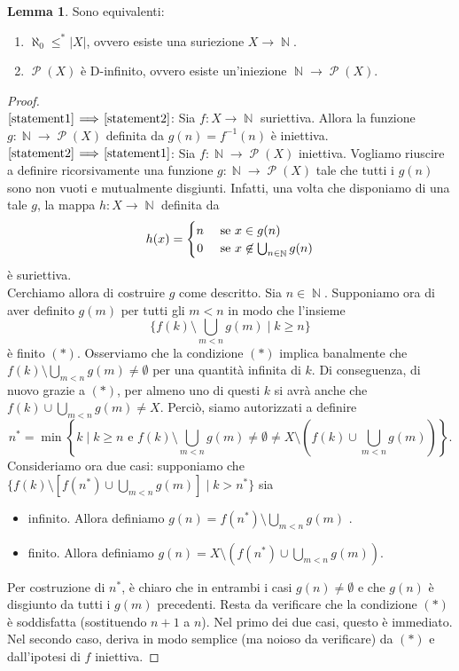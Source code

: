 \documentclass[12pt,a4paper]{report}
\theoremstyle{definition}
\newtheorem{lemma}[teo]{Lemma}  %
\theoremstyle{num.custom-title}
\DeclareMathOperator{\PP}{\mathcal{P}}
\DeclareMathOperator{\N}{\mathbb{N}}
\DeclareMathOperator{\sm}{\setminus}
\newcommand{\Implies}[2]{$\text{\ref{statement#1}}\!\implies\!\text{\ref{statement#2}}$}%
\newcommand{\punto}[1]{\item \label{statement#1}}
\newenvironment{equivalence}
    {\begin{enumerate}[label=(\arabic*),ref=(\arabic*)]
    }
    { 
	\end{enumerate}
    }
\begin{document}
\begin{lemma}\label{lemma_suriez_d-fin} Sono equivalenti:
\begin{equivalence}
\punto{1} $\aleph_0 \leq^* |X|$, ovvero esiste una suriezione $X \to \N$.
\punto{2} $\PP(X)$ è D-infinito, ovvero esiste un'iniezione $\N \to \PP(X)$.
\end{equivalence}
\begin{proof}\ \\
\Implies{1}{2}: Sia $f: X \to \N$ suriettiva. Allora la funzione $g: \N \to \PP(X)$ definita da $g(n)=f^{-1}(n)$ è iniettiva.\\
\Implies{2}{1}: Sia $f: \N \to \PP(X)$ iniettiva. Vogliamo riuscire a definire ricorsivamente una funzione $g: \N \to \PP(X)$ tale che tutti i $g(n)$ sono non vuoti e mutualmente disgiunti. Infatti, una volta che disponiamo di una tale $g$, la mappa $h: X \to \N$ definita da
\[
h(x)=
  \begin{cases} 
      \hfill		n	\hfill & \text{ se $x \in g(n)$} \\
      \hfill 	0		\hfill & \text{ se $x \not\in \bigcup_{n \in \N} g(n)$} \\
  \end{cases}
\]
è suriettiva.\\
Cerchiamo allora di costruire $g$ come descritto. Sia $n \in \N$. Supponiamo ora di aver definito $g(m)$ per tutti gli $m<n$ in modo che l'insieme 
\[
\{f(k) \sm \bigcup_{m<n} g(m) \mid k \geq n\}
\]
è finito $(*)$.
Osserviamo che la condizione $(*)$ implica banalmente che $f(k) \sm \bigcup_{m<n} g(m) \neq \emptyset$ per una quantità infinita di $k$. Di conseguenza, di nuovo grazie a $(*)$, per almeno uno di questi $k$ si avrà anche che $f(k) \cup \bigcup_{m<n} g(m) \neq X$. Perciò, siamo autorizzati a definire
\[
n^* = \min \left\{ k \; \Bigg\rvert \; k \geq n \text{ e } 
f(k) \sm \bigcup_{m<n} g(m) \neq \emptyset \neq X \sm \left( f(k) \cup \bigcup_{m<n} g(m) \right) \right\}.
\]
Consideriamo ora due casi: supponiamo che 
$\{f(k) \sm [f(n^*) \cup \bigcup_{m<n} g(m)] \mid k>n^*\}$ sia
\begin{itemize}
\item infinito. Allora definiamo $g(n) = f(n^*) \sm \bigcup_{m<n} g(m)$ .
\item finito. Allora definiamo $g(n) = X \sm \left( f(n^*) \cup \bigcup_{m<n} g(m) \right)$.
\end{itemize}
Per costruzione di $n^*$, è chiaro che in entrambi i casi $g(n) \neq \emptyset$ e che $g(n)$ è disgiunto da tutti i $g(m)$ precedenti. Resta da verificare che la condizione $(*)$ è soddisfatta (sostituendo $n+1$ a $n$). Nel primo dei due casi, questo è immediato. Nel secondo caso, deriva in modo semplice (ma noioso da verificare) da $(*)$ e dall'ipotesi di $f$ iniettiva.
\end{proof}
\end{lemma}
\end{document}
